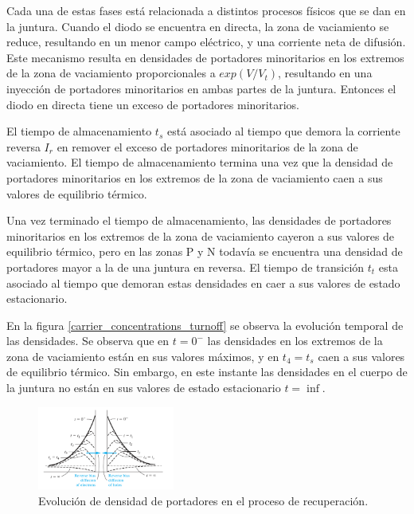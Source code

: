 Cada una de estas fases está relacionada a distintos procesos físicos que se dan
en la juntura. Cuando el diodo se encuentra en directa, la zona de vaciamiento
se reduce, resultando en un menor campo eléctrico, y una corriente neta de
difusión. Este mecanismo resulta en densidades de portadores minoritarios en los
extremos de la zona de vaciamiento proporcionales a $exp(V/V_t)$, resultando en
una inyección de portadores minoritarios en ambas partes de la juntura. Entonces
el diodo en directa tiene un exceso de portadores minoritarios.
\cite{neamen2012semiconductor}

El tiempo de almacenamiento $t_s$ está asociado al tiempo que demora la
corriente reversa $I_r$ en remover el exceso de portadores minoritarios de la
zona de vaciamiento. El tiempo de almacenamiento termina una vez que la densidad
de portadores minoritarios en los extremos de la zona de vaciamiento caen a sus
valores de equilibrio térmico.

Una vez terminado el tiempo de almacenamiento, las densidades de portadores
minoritarios en los extremos de la zona de vaciamiento cayeron a sus valores de
equilibrio térmico, pero en las zonas P y N todavía se encuentra una densidad de
portadores mayor a la de una juntura en reversa. El tiempo de transición $t_t$
esta asociado al tiempo que demoran estas densidades en caer a sus valores de
estado estacionario.

En la figura \ref{carrier_concentrations_turnoff} se observa la evolución
temporal de las densidades. Se observa que en $t=0^-$ las densidades en los
extremos de la zona de vaciamiento están en sus valores máximos, y en $t_4=t_s$
caen a sus valores de equilibrio térmico. Sin embargo, en este instante las
densidades en el cuerpo de la juntura no están en sus valores de estado
estacionario $t=\inf$.

\begin{figure}[t]
  \centering
    \includegraphics[width=0.4\textwidth]{images/carrier_concentrations_turnoff.jpg}
    \caption{Evolución de densidad de portadores en el proceso de recuperación.}
    \label{fig:carrier_concentrations_turnoff}
\end{figure}


